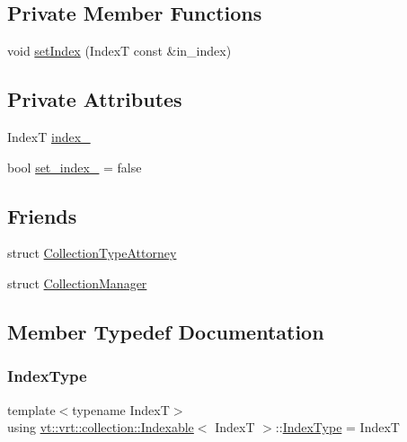 \subsection*{Private Member Functions}
\begin{DoxyCompactItemize}
\item 
void \hyperlink{structvt_1_1vrt_1_1collection_1_1_indexable_ac874c5ebba6b238f8f57018c01a3c67c}{set\+Index} (IndexT const \&in\+\_\+index)
\end{DoxyCompactItemize}
\subsection*{Private Attributes}
\begin{DoxyCompactItemize}
\item 
IndexT \hyperlink{structvt_1_1vrt_1_1collection_1_1_indexable_aa238a04594333c44308be2a063b3b70a}{index\+\_\+}
\item 
bool \hyperlink{structvt_1_1vrt_1_1collection_1_1_indexable_a946600975ab9eb4d1b122b6267bea35e}{set\+\_\+index\+\_\+} = false
\end{DoxyCompactItemize}
\subsection*{Friends}
\begin{DoxyCompactItemize}
\item 
struct \hyperlink{structvt_1_1vrt_1_1collection_1_1_indexable_abb4eb03ec2c75b459ceec69021d22a2b}{Collection\+Type\+Attorney}
\item 
struct \hyperlink{structvt_1_1vrt_1_1collection_1_1_indexable_af9288b1963f434a90b307b5305a49510}{Collection\+Manager}
\end{DoxyCompactItemize}


\subsection{Member Typedef Documentation}
\mbox{\label{structvt_1_1vrt_1_1collection_1_1_indexable_a448ea88cb04f689e0ff22241f21485c0}} 
\subsubsection{\texorpdfstring{Index\+Type}{IndexType}}
{\footnotesize\ttfamily template$<$typename IndexT$>$ \\
using \hyperlink{structvt_1_1vrt_1_1collection_1_1_indexable}{vt\+::vrt\+::collection\+::\+Indexable}$<$ IndexT $>$\+::\hyperlink{structvt_1_1vrt_1_1collection_1_1_indexable_a448ea88cb04f689e0ff22241f21485c0}{Index\+Type} =  IndexT}

